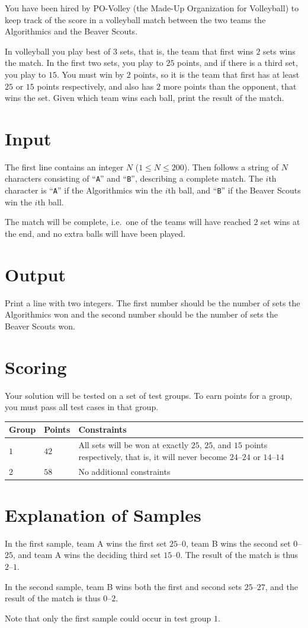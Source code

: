You have been hired by PO-Volley (the Made-Up Organization for Volleyball)
to keep track of the score in a volleyball match between the two teams the Algorithmics and the Beaver Scouts.

In volleyball you play best of $3$ sets, that is, the team
that first wins $2$ sets wins the match. In the first two sets, you play to
$25$ points, and if there is a third set, you play to $15$.
You must win by $2$ points, so it is the team that first has
at least $25$ or $15$ points respectively, and also has $2$ more points than the opponent,
that wins the set. Given which team wins each ball, print the result of the match.

\section*{Input}
The first line contains an integer $N$ ($1 \le N \le 200$).
Then follows a string of $N$ characters consisting of ``\texttt{A}'' and ``\texttt{B}'', describing a complete match.
The $i$th character is ``\texttt{A}'' if the Algorithmics win the $i$th ball, and ``\texttt{B}'' if the Beaver Scouts win the $i$th ball.

The match will be complete, i.e.\ one of the teams will have reached $2$ set wins at the end, and no extra balls will have been played.

\section*{Output}
Print a line with two integers. The first number should be the number of sets the Algorithmics won
and the second number should be the number of sets the Beaver Scouts won.

\section*{Scoring}
Your solution will be tested on a set of test groups.
To earn points for a group, you must pass all test cases in that group.

\noindent
\begin{tabular}{| l | l | l |}
\hline
Group & Points & Constraints \\ \hline
$1$    & $42$          &  All sets will be won at exactly $25$, $25$, and $15$ points respectively, that is, it will never become $24$--$24$ or $14$--$14$\\ \hline
$2$    & $58$          &  No additional constraints \\ \hline
\end{tabular}

\section*{Explanation of Samples}
In the first sample, team A wins the first set $25$--$0$,
team B wins the second set $0$--$25$, and team A wins the deciding
third set $15$--$0$.
The result of the match is thus $2$--$1$.

In the second sample, team B wins both the first and second sets $25$--$27$, and the result of the match is thus $0$--$2$.

Note that only the first sample could occur in test group $1$.
